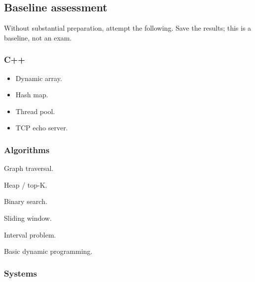 \documentclass[11pt,letterpaper]{article}
\begin{document}
\subsection*{Baseline assessment}

Without substantial preparation, attempt the following. Save the results; this is a baseline, not an exam.

\subsubsection*{C++}

\begin{itemize}

\item Dynamic array.

\item Hash map.

\item Thread pool.

\item TCP echo server.

\end{itemize}

\subsubsection*{Algorithms}

\begin{topics}

\item Graph traversal.

\item Heap / top-K.

\item Binary search.

\item Sliding window.

\item Interval problem.

\item Basic dynamic programming.

\end{topics}

\subsubsection*{Systems}
\end{document}
